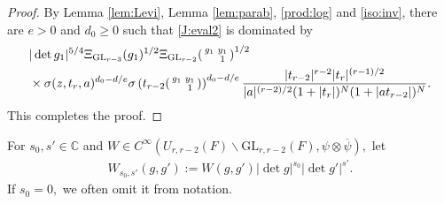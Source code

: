 \documentclass[12pt]{amsart}
\theoremstyle{remark}
\numberwithin{equation}{section}
\newcommand{\GL}{\mathrm{GL}}
\newcommand{\CC}{\mathbb{C}}
\theoremstyle{definition}
\newenvironment{psmatrix}
  {\left(\begin{smallmatrix}}
  {\end{smallmatrix}\right)}
\numberwithin{equation}{subsection}
\begin{document}
\begin{proof}
By Lemma \ref{lem:Levi}, Lemma \ref{lem:parab}, \eqref{prod:log} and \eqref{iso:inv}, there are $e>0$ and $d_0\ge 0$ such that \eqref{J:eval2} is dominated by 
\begin{align*}
    &|\det g_1|^{5/4}\Xi_{\GL_{r-3}}(g_1)^{1/2}\Xi_{\GL_{r-2}}\begin{psmatrix}
        g_1 &y_1 \\
          & 1
    \end{psmatrix}^{1/2}\\
    &\times\sigma(z,t_r,a)^{d_0-d/e}\sigma\left(t_{r-2}\begin{psmatrix}
        g_1 &y_1 \\
          & 1
    \end{psmatrix}\right)^{d_0-d/e}\frac{|t_{r-2}|^{r-2}|t_r|^{(r-1)/2}}{|a|^{(r-2)/2}(1+|t_r|)^{N}(1+|at_{r-2}|)^N}.
\end{align*}
This completes the proof.
\end{proof}

For $s_0,s' \in \CC$ and $W \in C^\infty(U_{r,r-2}(F) \backslash \GL_{r,r-2}(F),\psi \otimes \overline{\psi}),$ let
\begin{align*}
    W_{s_0,s'}(g,g'):=W(g,g')|\det g|^{s_0}|\det g'|^{s'}.
\end{align*}
If $s_0=0,$ we often omit it from notation.
\end{document}
